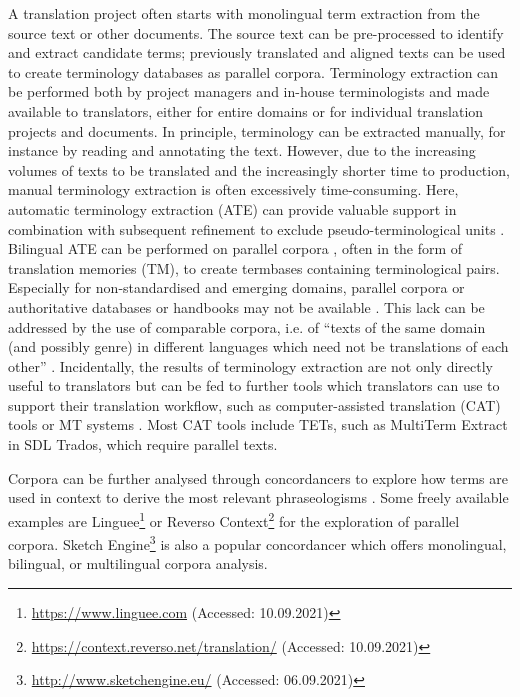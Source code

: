A translation project often starts with monolingual term extraction from the source text or other documents. The source text can be pre-processed to identify and extract candidate terms; previously translated and aligned texts can be used to create terminology databases as parallel corpora. Terminology extraction can be performed both by project managers and in-house terminologists and made available to translators, either for entire domains or for individual translation projects and documents. In principle, terminology can be extracted manually, for instance by reading and annotating the text. However, due to the increasing volumes of texts to be translated and the increasingly shorter time to production, manual terminology extraction is often excessively time-consuming. Here, automatic terminology extraction (ATE) can provide valuable support in combination with subsequent refinement to exclude pseudo-terminological units \citep[88]{pavel2001handbook}. Bilingual ATE can be performed on parallel corpora \citep{vintar2001using}, often in the form of translation memories (TM), to create termbases containing terminological pairs. Especially for non-standardised and emerging domains, parallel corpora \citep[263]{blancafort2010ttc} or authoritative databases or handbooks may not be available \citep[586]{heid2012term}. This lack can be addressed by the use of comparable corpora, i.e. of ``texts of the same domain (and possibly genre) in different languages which need not be translations of each other'' \citep[1]{blancafort2011user}. Incidentally, the results of terminology extraction are not only directly useful to translators but can be fed to further tools which translators can use to support their translation workflow, such as computer-assisted translation (CAT) tools or MT systems \citep[588]{heid2012term}. Most CAT tools include TETs, such as MultiTerm Extract in SDL Trados, which require parallel texts.

Corpora can be further analysed through concordancers to explore how terms are used in context to derive the most relevant phraseologisms \citep[89]{pavel2001handbook}.
Some freely available examples are Linguee\footnote{\url{https://www.linguee.com} (Accessed: 10.09.2021)} or Reverso Context\footnote{\url{https://context.reverso.net/translation/} (Accessed: 10.09.2021)} for the exploration of parallel corpora. Sketch Engine\footnote{\url{http://www.sketchengine.eu/} (Accessed: 06.09.2021)} \citep{kilgarriff2014sketch} is also a popular concordancer which offers monolingual, bilingual, or multilingual corpora analysis.

